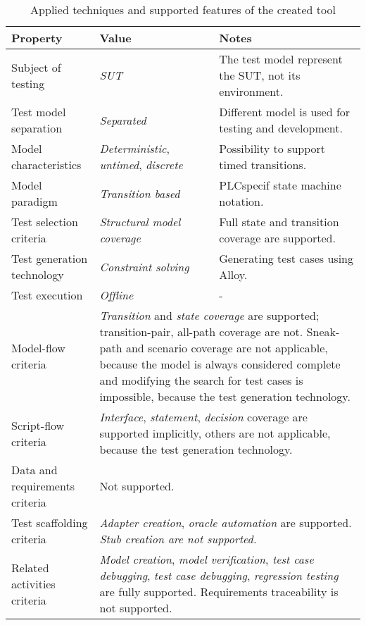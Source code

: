 \begin{table}[htb]
\begin{center}
\begin{tabular}{p{4cm}p{3.5cm}p{6.5cm}}
\toprule
	\textbf{Property} & \textbf{Value} & \textbf{Notes} \\\midrule
	Subject of testing & \textit{SUT} & The test model represent the SUT, not its environment. \\
	Test model separation & \textit{Separated} & Different model is used for testing and development.\\
	Model characteristics & \textit{Deterministic}, \textit{untimed}, \textit{discrete} & Possibility to support timed transitions. \\
	Model paradigm & \textit{Transition based} & PLCspecif state machine notation.\\
	Test selection criteria & \textit{Structural model coverage} & Full state and transition coverage are supported.\\
	Test generation technology & \textit{Constraint solving} & Generating test cases using Alloy. \\
	Test execution & \textit{Offline} & - \\\midrule
	Model-flow criteria & \multicolumn{2}{p{10.5cm}}{\textit{Transition} and \textit{state coverage} are supported; transition-pair, all-path coverage are not. Sneak-path and scenario coverage are not applicable, because the model is always considered complete and modifying the search for test cases is impossible, because the test generation technology.} \\
	Script-flow criteria & \multicolumn{2}{p{10.5cm}}{\textit{Interface}, \textit{statement}, \textit{decision} coverage are supported implicitly, others are not applicable, because the test generation technology.} \\
	Data and requirements criteria & \multicolumn{2}{p{10.5cm}}{Not supported.} \\
	Test scaffolding criteria & \multicolumn{2}{p{10.5cm}}{\textit{Adapter creation}, \textit{oracle automation} are supported. \textit{Stub creation are not supported.}} \\
	Related activities criteria & \multicolumn{2}{p{10.5cm}}{\textit{Model creation}, \textit{model verification}, \textit{test case debugging}, \textit{test case debugging}, \textit{regression testing} are fully supported. Requirements traceability is not supported.} \\
\bottomrule
\end{tabular}
\end{center}
\caption{\label{tab:toolevaluation} Applied techniques and supported features of the created tool}
\end{table}

